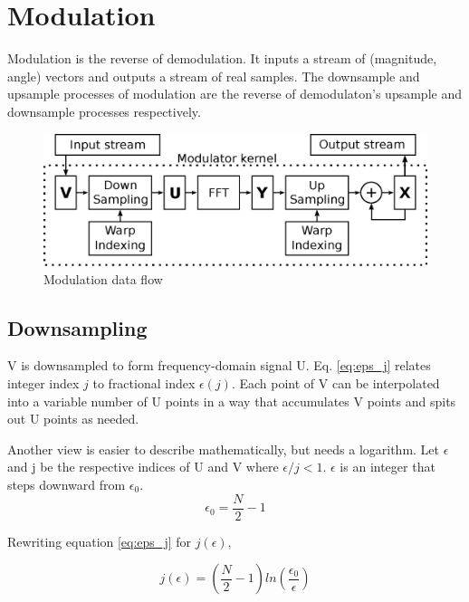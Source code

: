 \section{Modulation}

Modulation is the reverse of demodulation.
It inputs a stream of (magnitude, angle) vectors and outputs a stream of real
samples. The downsample and upsample processes of modulation are the reverse
of demodulaton's upsample and downsample processes respectively.

\begin{figure}
	\centering
	\includegraphics[width=0.95\linewidth]{../source/mod_e}
	\caption[Causal to Emergent Time Demodulation]{Modulation data flow}
	\label{fig:mod}
\end{figure}

\subsection{Downsampling}

V is downsampled to form frequency-domain signal U.
Eq. \ref{eq:eps_j} relates integer index $j$ to fractional index $\epsilon(j)$.
Each point of V can be interpolated into a variable number of U points in a way
that accumulates V points and spits out U points as needed.

Another view is easier to describe mathematically, but needs a logarithm. Let
$\epsilon$ and j be the respective indices of U and V where $\epsilon/j < 1$.
$\epsilon$ is an integer that steps downward from $\epsilon_0$.
\begin{equation}
\epsilon_0 = \frac{N}{2} - 1
\end{equation}

Rewriting equation \ref{eq:eps_j} for $j(\epsilon)$,

\begin{equation}  \label{eq:j_eps}
j(\epsilon) = \left(\frac{N}{2}-1\right)
ln\left(\frac{\epsilon_0}{\epsilon}\right)
\end{equation}

